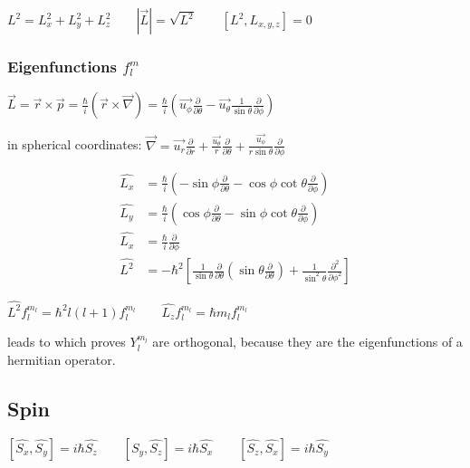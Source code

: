 \documentclass[10pt,a4paper]{scrartcl}
\begin{document}
\begin{multicols*}{3}
		
	$L^2 = L_x^2+L_y^2+L_z^2 \qquad |\vec{L}|=\sqrt{L^2}\qquad [L^2,L_{x,y,z}]=0$
	
	
	
	\subsubsection{Eigenfunctions $f_l^m$}
	
	$\vec{L}=\vec{r}\times\vec{p}=\frac{\hbar}{i}(\vec{r}\times\vec{\nabla})=\frac{\hbar}{i}\left(\vec{u_\phi}\frac{\partial}{\partial\theta}-\vec{u_\theta}\frac{1}{\sin\theta}\frac{\partial}{\partial\phi}\right)$
	
	in spherical coordinates: $\vec{\nabla}=\vec{u_r}\frac{\partial}{\partial r}+\frac{\vec{u_\theta}}{r}\frac{\partial}{\partial \theta}+\frac{\vec{u_\phi}}{r\sin\theta}\frac{\partial}{\partial \phi}$
	
	\begin{align*}
	\hat{L_x} &=\frac{\hbar}{i}\left(-\sin\phi\frac{\partial}{\partial\theta}-\cos\phi\cot\theta\frac{\partial}{\partial\phi}\right)\\
	\hat{L_y} &=\frac{\hbar}{i}\left(\cos\phi\frac{\partial}{\partial\theta}-\sin\phi\cot\theta\frac{\partial}{\partial\phi}\right)\\
	\hat{L_x} &=\frac{\hbar}{i}\frac{\partial}{\partial\phi}\\
	\hat{L^2} &=-\hbar^2\left[\frac{1}{\sin\theta}\frac{\partial}{\partial\theta}\left(\sin\theta\frac{\partial}{\partial\theta}\right)+\frac{1}{\sin^2\theta}\frac{\partial^2}{\partial\phi^2}\right]
	\end{align*}

	$\hat{L^2}f_l^{m_l}=\hbar^2l(l+1)f_l^{m_l}\qquad \hat{L_z}f_l^{m_l}=\hbar m_l f_l^{m_l}$
	
	leads to  which proves $Y_l^{m_l}$ are orthogonal, because they are the eigenfunctions of a hermitian operator.
	
	\subsection{Spin}
	
	$[\hat{S_x},\hat{S_y}]=i\hbar\hat{S_z}\qquad [\hat{S_y},\hat{S_z}]=i\hbar\hat{S_x}\qquad [\hat{S_z},\hat{S_x}]=i\hbar\hat{S_y}$
	

\end{multicols*}
\end{document}

